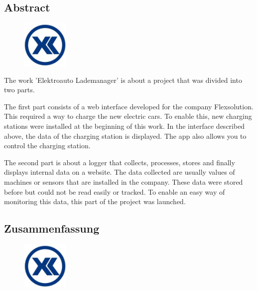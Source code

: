 \begin{spacing}{1}
    \chapter*{Abstract}
\end{spacing}
\begin{figure}
    \begin{center}
      \includegraphics[width=0.2\textwidth]{pics/Firmenlogo.jpeg}
    \end{center}
\end{figure}
The work 'Elektroauto Lademanager' is about a project that was divided into two parts.

The first part consists of a web interface developed for the company Flexsolution. This required a way to charge the new electric cars. To enable this, new charging stations were installed at the beginning of this work. In the interface described above, the data of the charging station is displayed. The app also allows you to control the charging station.

The second part is about a logger that collects, processes, stores and finally displays internal data on a website. The data collected are usually values of machines or sensors that are installed in the company. These data were stored before but could not be read easily or tracked. To enable an easy way of monitoring this data, this part of the project was launched.
\newpage
\begin{spacing}{1}
    \chapter*{Zusammenfassung}
\end{spacing}
\begin{figure}
    \begin{center}
      \includegraphics[width=0.2\textwidth]{pics/Firmenlogo.jpeg}
    \end{center}
\end{figure}

